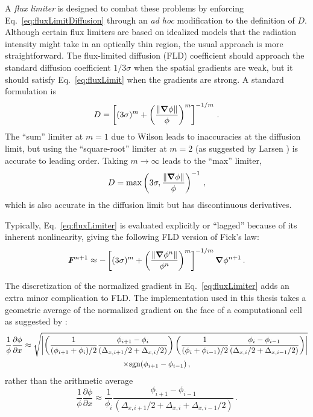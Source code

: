 A \emph{flux limiter} is designed to combat these problems by enforcing
Eq.~\eqref{eq:fluxLimitDiffusion} through an \emph{ad hoc} modification to
the definition of $D$.
Although certain flux limiters \cite{Lev1984} are based on
idealized models that the radiation intensity might take in an optically thin
region, the usual approach is more
straightforward. The flux-limited diffusion (FLD) coefficient should approach the
standard diffusion coefficient $1/3\sigma$ when the spatial gradients are weak,
but it should satisfy Eq.~\eqref{eq:fluxLimit} when the gradients are strong.
A standard formulation \cite{Ols2000} is
\begin{equation} \label{eq:fluxLimiter}
  D = \left[ (3\sigma)^{m} + \left( \frac{\left\| \bm{\nabla}
  \phi \right\|}{\phi} \right)^{m}\right]^{-1/m} \,.
\end{equation}
The ``sum'' limiter at $m=1$ due to Wilson \cite{Mor2000} leads to inaccuracies
at the diffusion limit, but using the ``square-root'' limiter at $m=2$ (as
suggested by Larsen \cite{Ols2000}) is accurate to leading order. Taking
$m\to\infty$ leads to the ``max'' limiter,
\begin{equation} \label{eq:fluxLimiterMax}
  D = \max\left( 3\sigma, \frac{\left\| \bm{\nabla} \phi \right\|}{\phi}
  \right)^{-1}\,,
\end{equation}
which is also accurate in the
diffusion limit but has discontinuous derivatives.

Typically, Eq.~\eqref{eq:fluxLimiter} is evaluated explicitly or ``lagged''
because of its inherent nonlinearity, giving the following FLD version of Fick's
law:
\begin{equation*}
  \bm{F}^{n+1} \approx - \left[ (3\sigma)^{m} + \left( \frac{\left\| \bm{\nabla}
  \phi^{n} \right\|}{\phi^{n}} \right)^{m}\right]^{-1/m} \bm{\nabla} \phi^{n+1} \,.
\end{equation*}

The discretization of the normalized gradient in Eq.~\eqref{eq:fluxLimiter}
adds an extra minor complication to FLD. The implementation
used in this thesis takes a geometric average of the normalized gradient on the
face of a computational cell as suggested by \cite{Ols2007}:
\begin{multline*}
 \frac{1}{\phi} \frac{\partial \phi}{\partial x}
  \approx
\sqrt{\left|  \left(  \frac{1}{(\phi_{i+1} + \phi_{i})/2} \frac{\phi_{i+1} - \phi_{i}}
 { (\Delta_{x,i+1}/2 + \Delta_{x,i}/2)} \right)
\left(  \frac{1}{(\phi_{i} + \phi_{i-1})/2} \frac{\phi_{i} - \phi_{i-1}}
{ (\Delta_{x,i}/2 + \Delta_{x,i-1}/2)} \right)  \right|}
\\
\times
 \mathrm{sgn}(\phi_{i+1} - \phi_{i-1})\,,
\end{multline*}
rather than the arithmetic average
\begin{equation*}
 \frac{1}{\phi} \frac{\partial \phi}{\partial x}
  \approx
 \frac{1}{\phi_{i}} \frac{\phi_{i+1} - \phi_{i-1}}
 { (\Delta_{x,i+1}/2 + \Delta_{x,i} + \Delta_{x,i-1}/2)}\,.
\end{equation*}

